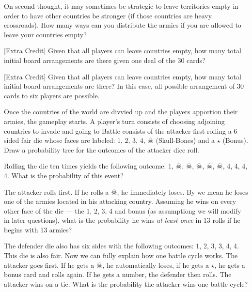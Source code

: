 \documentclass[12pt]{article}
\begin{document}
 On second thought, it may sometimes be strategic to leave territories empty in order to have other countries be stronger (if those countries are heavy crossroads). How many ways can you distribute the armies if you are allowed to leave your countries empty? 

 [Extra Credit] Given that all players can leave countries empty, how many total initial board arrangements are there given one deal of the 30 cards? 

 [Extra Credit] Given that all players can leave countries empty, how many total initial board arrangements are there? In this case, all possible arrangement of 30 cards to six players are possible. 

 Once the countries of the world are divvied up and the players apportion their armies, the gameplay starts. A player's turn consists of choosing adjoining countries to invade and going to  Battle consists of the attacker first rolling a 6 sided fair die whose faces are labeled: 1, 2, 3, 4, $\skull$ (Skull-Bones) and a \textcircled{$\star$} (Bonus). Draw a probability tree for the outcomes of the attacker dice roll. 

 Rolling the die ten times yields the following outcome: 1, $\skull$, $\skull$, $\skull$, $\skull$, $\skull$, 4, 4, 4, 4. What is the probability of this event? 


 The attacker rolls first. If he rolls a $\skull$, he immediately loses.  By  we mean he loses one of the armies located in his attacking country. Assuming he wins on every other face of the die --- the 1, 2, 3, 4 and bonus (as assumptiong we will modify in later questions), what is the probability he wins \textit{at least once} in 13 rolls if he begins with 13 armies? 

 The defender die also has six sides with the following outcomes: 1, 2, 3, 3, 4, 4. This die is also fair. Now we can fully explain how one battle cycle works. The attacker goes first. If he gets a $\skull$, he automatically loses, if he gets a \textcircled{$\star$}, he gets a bonus card and rolls again. If he gets a number, the defender then rolls. The attacker wins on a tie. What is the probability the attacker wins one battle cycle? 
\end{document}
